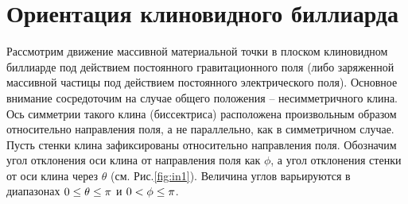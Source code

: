 \documentclass[a4paper]{article}
\begin{document}
%
%
%

\section{Ориентация клиновидного биллиарда}

Рассмотрим движение массивной материальной точки в плоском клиновидном биллиарде под действием постоянного гравитационного поля (либо заряженной массивной частицы под действием постоянного электрического поля). Основное внимание сосредоточим на случае общего положения -- несимметричного клина. Ось симметрии такого клина (биссектриса) расположена произвольным образом относительно направления поля, а не параллельно, как в симметричном случае. Пусть стенки клина зафиксированы относительно направления поля. Обозначим угол отклонения оси клина от направления поля как $\phi $, а угол отклонения стенки от оси клина через $\theta $ (см. Рис.\ref{fig:in1}). Величина углов варьируются в диапазонах ${\rm 0}\le \theta \le \pi $ и ${\rm 0}<\phi \le \pi$.
\end{document}
